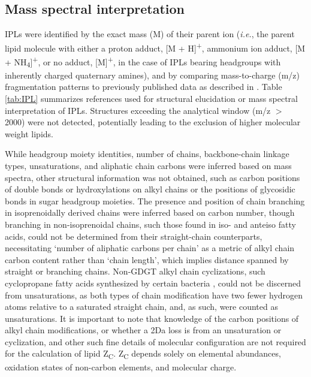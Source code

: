 \subsection{Mass spectral interpretation} IPLs were identified by the exact mass (M) of their parent ion (\textit{i.e.}, the parent lipid molecule with either a proton adduct, [M + H]\textsuperscript{+}, ammonium ion adduct, [M + NH\textsubscript{4}]\textsuperscript{+}, or no adduct, [M]\textsuperscript{+}, in the case of IPLs bearing headgroups with inherently charged quaternary amines), and by comparing mass-to-charge (m/z) fragmentation patterns to previously published data as described in \cite{Sturt_Intact_2004}. Table \ref{tab:IPL} summarizes references used for structural elucidation or mass spectral interpretation of IPLs. Structures exceeding the analytical window (m/z $>$ 2000) were not detected, potentially leading to the exclusion of higher molecular weight lipids.

While headgroup moiety identities, number of chains, backbone-chain linkage types, unsaturations, and aliphatic chain carbons were inferred based on mass spectra, other structural information was not obtained, such as carbon positions of double bonds or hydroxylations on alkyl chains or the positions of glycosidic bonds in sugar headgroup moieties. The presence and position of chain branching in isoprenoidally derived chains were inferred based on carbon number, though branching in non-isoprenoidal chains, such those found in iso- and anteiso fatty acids, could not be determined from their straight-chain counterparts, necessitating `number of aliphatic carbons per chain' as a metric of alkyl chain carbon content rather than `chain length', which implies distance spanned by straight or branching chains. Non-GDGT alkyl chain cyclizations, such cyclopropane fatty acids synthesized by certain bacteria \citep{grogan1997cyclopropane}, could not be discerned from unsaturations, as both types of chain modification have two fewer hydrogen atoms relative to a saturated straight chain, and, as such, were counted as unsaturations. It is important to note that knowledge of the carbon positions of alkyl chain modifications, or whether a 2Da loss is from an unsaturation or cyclization, and other such fine details of molecular configuration are not required for the calculation of lipid Z\textsubscript{C}. Z\textsubscript{C} depends solely on elemental abundances, oxidation states of non-carbon elements, and molecular charge.

